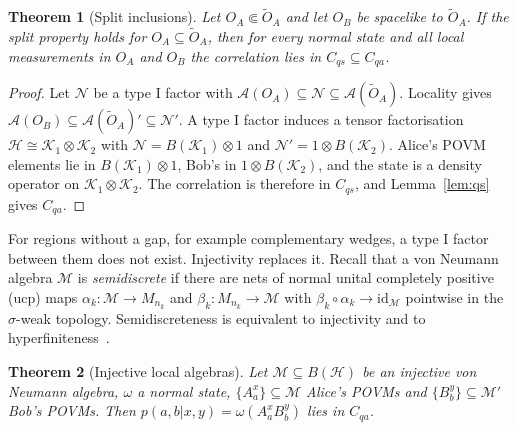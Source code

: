 \documentclass[11pt]{article}
\newtheorem{theorem}{Theorem}
\theoremstyle{definition}\newtheorem{definition}{Definition}[section]
\theoremstyle{remark}\newtheorem*{remark}{Remark}
\newcommand{\Hil}{\mathcal H}
\newcommand{\A}{\mathcal A}
\newcommand{\M}{\mathcal M}
\newcommand{\N}{\mathcal N}
\newcommand{\Cqa}{C_{qa}}
\newcommand{\Cqs}{C_{qs}}
\begin{document}
\begin{theorem}[Split inclusions]
\label{thm:split}
Let $O_A\Subset\tilde O_A$ and let $O_B$ be spacelike to $\tilde O_A$. If the split property holds for $O_A\subseteq\tilde O_A$, then for
every normal state and all local measurements in $O_A$ and $O_B$ the correlation lies in $\Cqs\subseteq\Cqa$.
\end{theorem}

\begin{proof}
Let $\N$ be a type I factor with $\A(O_A)\subseteq\N\subseteq\A(\tilde O_A)$. Locality gives $\A(O_B)\subseteq\A(\tilde O_A)'\subseteq\N'$. A type I
factor induces a tensor factorisation $\Hil\cong\mathcal K_1\otimes\mathcal K_2$ with $\N=B(\mathcal K_1)\otimes1$ and $\N'=1\otimes B(\mathcal K_2)$. Alice's
POVM elements lie in $B(\mathcal K_1)\otimes1$, Bob's in $1\otimes B(\mathcal K_2)$, and the state is a density operator on $\mathcal K_1\otimes\mathcal K_2$.
The correlation is therefore in $\Cqs$, and Lemma~\ref{lem:qs} gives $\Cqa$.
\end{proof}

For regions without a gap, for example complementary wedges, a type I factor between them does not exist. Injectivity
replaces it. Recall that a von Neumann algebra $\M$ is \emph{semidiscrete} if there are nets of normal unital completely
positive (ucp) maps $\alpha_k:\M\to M_{n_k}$ and $\beta_k:M_{n_k}\to\M$ with $\beta_k\circ\alpha_k\to\mathrm{id}_\M$ pointwise in the
$\sigma$-weak topology. Semidiscreteness is equivalent to injectivity and to hyperfiniteness~\cite{Connes,EffrosLance}.

\begin{theorem}[Injective local algebras]
\label{thm:injective}
Let $\M\subseteq B(\Hil)$ be an injective von Neumann algebra, $\omega$ a normal state, $\{A^x_a\}\subseteq\M$ Alice's POVMs and
$\{B^y_b\}\subseteq\M'$ Bob's POVMs. Then $p(a,b|x,y)=\omega(A^x_aB^y_b)$ lies in $\Cqa$.
\end{theorem}
\end{document}
